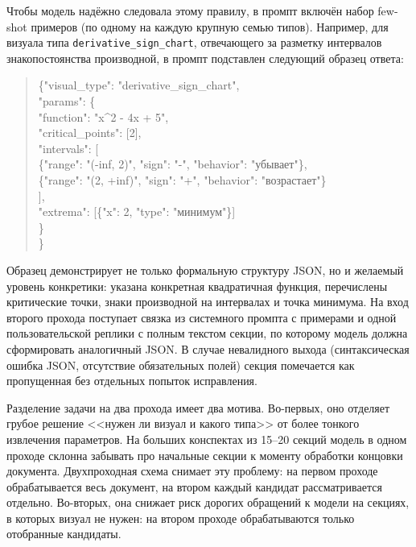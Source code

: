 \noindent Чтобы модель надёжно следовала этому правилу, в промпт включён набор few-shot примеров (по одному на каждую крупную семью типов). Например, для визуала типа \texttt{derivative\_sign\_chart}, отвечающего за разметку интервалов знакопостоянства производной, в промпт подставлен следующий образец ответа:

\begingroup
{}
\begin{quote}
\small\ttfamily
\{"visual\_type": "derivative\_sign\_chart",\\
\hspace*{1em}"params": \{\\
\hspace*{2em}"function": "x\textasciicircum 2 - 4x + 5",\\
\hspace*{2em}"critical\_points": [2],\\
\hspace*{2em}"intervals": [\\
\hspace*{3em}\{"range": "(-inf, 2)", "sign": "-", "behavior": "убывает"\},\\
\hspace*{3em}\{"range": "(2, +inf)", "sign": "+", "behavior": "возрастает"\}\\
\hspace*{2em}],\\
\hspace*{2em}"extrema": [\{"x": 2, "type": "минимум"\}]\\
\hspace*{1em}\}\\
\}
\end{quote}
\endgroup

\noindent Образец демонстрирует не только формальную структуру JSON, но и желаемый уровень конкретики: указана конкретная квадратичная функция, перечислены критические точки, знаки производной на интервалах и точка минимума. На вход второго прохода поступает связка из системного промпта с примерами и одной пользовательской реплики с полным текстом секции, по которому модель должна сформировать аналогичный JSON. В случае невалидного выхода (синтаксическая ошибка JSON, отсутствие обязательных полей) секция помечается как пропущенная без отдельных попыток исправления.

Разделение задачи на два прохода имеет два мотива. Во\nobreakdash-первых, оно отделяет грубое решение <<нужен ли визуал и какого типа>> от более тонкого извлечения параметров. На больших конспектах из 15--20 секций модель в одном проходе склонна забывать про начальные секции к моменту обработки концовки документа. Двухпроходная схема снимает эту проблему: на первом проходе обрабатывается весь документ, на втором каждый кандидат рассматривается отдельно. Во\nobreakdash-вторых, она снижает риск дорогих обращений к модели на секциях, в которых визуал не нужен: на втором проходе обрабатываются только отобранные кандидаты.

